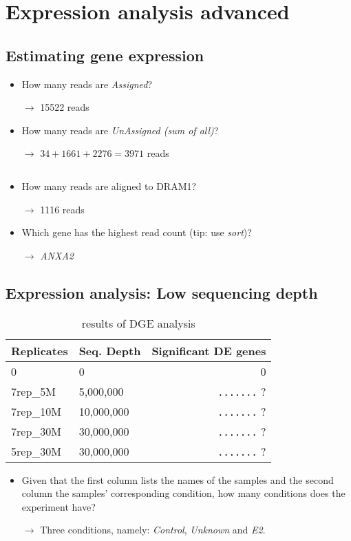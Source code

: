 \section{Expression analysis advanced}
\subsection{Estimating gene expression}
\begin{itemize}
	\item How many reads are \textit{Assigned}?
	\item[$\rightarrow$] 15522 reads
	\item How many reads are \textit{UnAssigned (sum of all)}?
	\item[$\rightarrow$] $34+1661+2276=3971$ reads
	\item[$$]
	\item How many reads are aligned to DRAM1?
	\item[$\rightarrow$] 1116 reads
	\item Which gene has the highest read count (tip: use \textit{sort})?
	\item[$\rightarrow$] \textit{ANXA2}
\end{itemize}

\subsection{Expression analysis: Low sequencing depth}

\begin{table}[]
\centering
\caption{results of DGE analysis}
\label{tab:dge_ad_01}
\begin{tabular}{ | l | l | r | }
\hline
Replicates & Seq. Depth & Significant DE genes \\
\hline
0          & 0          & 0\quad\quad \\
7rep\_5M   & 5,000,000  & \verb|.......| ? \\
7rep\_10M  & 10,000,000 & \verb|.......| ? \\
7rep\_30M  & 30,000,000 & \verb|.......| ? \\
5rep\_30M  & 30,000,000 & \verb|.......| ? \\
\hline
\end{tabular}
\end{table}

\begin{itemize}
	\item Given that the first column lists the names of the samples and the second column the samples' corresponding condition, how many conditions does the experiment have?
	\item[$\rightarrow$] Three conditions, namely: \textit{Control}, \textit{Unknown} and \textit{E2}.
\end{itemize}

